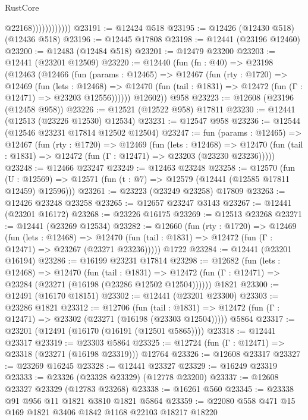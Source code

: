 \begin{lexlean}{RustCore}
\begin{coremodule}
                            @22168))))))))))))
@23191 := @12424 @518
@23195 := @12426 (@12430 @518) (@12436 @518)
@23196 := @12445 @17808
@23198 := @12441 (@23196 @12460)
@23200 := @12483 (@12484 @518)
@23201 := @12479 @23200
@23203 := @12441 (@23201 @12509)
@23220 := @12440
    (fun (fn : @40) =>
    @23198
      (@12463
        (@12466
          (fun (params : @12465) =>
          @12467
            (fun (rty : @1720) =>
            @12469
              (fun (lets : @12468) =>
              @12470 (fun (tail : @1831) => @12472 (fun (Γ : @12471) => @23203 @12556))))))
        @12602))
    @958
@23223 := @12608 (@23196 (@12458 @958))
@23226 := @12521 (@12522 @958) @17811
@23230 := @12441 (@12513 (@23226 @12530) @12534)
@23231 := @12547 @958
@23236 := @12544 (@12546 @23231 @17814 @12502 @12504)
@23247 := fun (params : @12465) =>
  @12467
    (fun (rty : @1720) =>
    @12469
      (fun (lets : @12468) =>
      @12470 (fun (tail : @1831) => @12472 (fun (Γ : @12471) => @23203 (@23230 @23236)))))
@23248 := @12466 @23247
@23249 := @12463 @23248
@23258 := @12570
    (fun (U : @12569) => @12571 (fun (t : @7) => @12579 (@12441 (@12585 @17811 @12459) @12596)))
@23261 := @23223 (@23249 @23258) @17809
@23263 := @12426 @23248 @23258
@23265 := @12657 @23247 @3143
@23267 := @12441 (@23201 @16172)
@23268 := @23226 @16175
@23269 := @12513 @23268
@23271 := @12441 (@23269 @12534)
@23282 := @12660
    (fun (rty : @1720) =>
    @12469
      (fun (lets : @12468) =>
      @12470 (fun (tail : @1831) => @12472 (fun (Γ : @12471) => @23267 (@23271 @23236)))))
    @1722
@23284 := @12441 (@23201 @16194)
@23286 := @16199 @23231 @17814
@23298 := @12682
    (fun (lets : @12468) =>
    @12470
      (fun (tail : @1831) =>
      @12472 (fun (Γ : @12471) => @23284 (@23271 (@16198 (@23286 @12502 @12504))))))
    @1821
@23300 := @12491 (@16170 @18151)
@23302 := @12441 (@23201 @23300)
@23303 := @23286 @1821
@23312 := @12706
    (fun (tail : @1831) => @12472 (fun (Γ : @12471) => @23302 (@23271 (@16198 (@23303 @12504)))))
    @5864
@23317 := @23201 (@12491 (@16170 (@16191 (@12501 @5865))))
@23318 := @12441 @23317
@23319 := @23303 @5864
@23325 := @12724 (fun (Γ : @12471) => @23318 (@23271 (@16198 @23319))) @12764
@23326 := @12608 @23317
@23327 := @23269 @16245
@23328 := @12441 @23327
@23329 := @16249 @23319
@23333 := @23326 (@23328 @23329) (@12778 @23200)
@23337 := @12608 @23327 @23329 (@12783 @23268)
@23338 := @16261 @560
@23345 := @23338 @91 @956 @11 @1821 @3810 @1821 @5864
@23359 := @22080
    @558
    @471
    @15
    @169
    @1821
    @3406
    @1842
    @1168
    @22103
    @18217
    @18220

\end{coremodule}
\end{lexlean}
